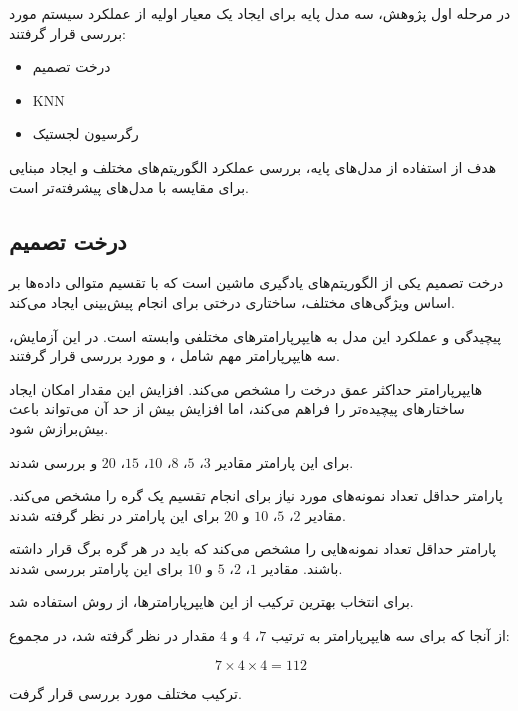 \documentclass[10pt,a4paper,twocolumn]{article}
\begin{document}
در مرحله اول پژوهش، سه مدل پایه برای ایجاد یک معیار اولیه
از عملکرد سیستم مورد بررسی قرار گرفتند:

\begin{itemize}
    \item درخت تصمیم
    \item KNN
    \item رگرسیون لجستیک
\end{itemize}

هدف از استفاده از مدل‌های پایه، بررسی عملکرد الگوریتم‌های
مختلف و ایجاد مبنایی برای مقایسه با مدل‌های پیشرفته‌تر است.


\subsection{درخت تصمیم}

درخت تصمیم یکی از الگوریتم‌های یادگیری ماشین است که با تقسیم
متوالی داده‌ها بر اساس ویژگی‌های مختلف، ساختاری درختی برای
انجام پیش‌بینی ایجاد می‌کند.

پیچیدگی و عملکرد این مدل به هایپرپارامترهای مختلفی وابسته است.
در این آزمایش، سه هایپرپارامتر مهم شامل
،
 و
 مورد بررسی قرار گرفتند.

هایپرپارامتر  حداکثر عمق درخت را مشخص می‌کند.
افزایش این مقدار امکان ایجاد ساختارهای پیچیده‌تر را فراهم
می‌کند، اما افزایش بیش از حد آن می‌تواند باعث بیش‌برازش شود.

برای این پارامتر مقادیر
$3$، $5$، $8$، $10$، $15$، $20$ و 
بررسی شدند.

پارامتر  حداقل تعداد نمونه‌های مورد
نیاز برای انجام تقسیم یک گره را مشخص می‌کند. مقادیر
$2$، $5$، $10$ و $20$ برای این پارامتر در نظر گرفته شدند.

پارامتر  حداقل تعداد نمونه‌هایی را
مشخص می‌کند که باید در هر گره برگ قرار داشته باشند. مقادیر
$1$، $2$، $5$ و $10$ برای این پارامتر بررسی شدند.

برای انتخاب بهترین ترکیب از این هایپرپارامترها، از روش
 استفاده شد.

از آنجا که برای سه هایپرپارامتر به ترتیب $7$، $4$ و $4$ مقدار
در نظر گرفته شد، در مجموع:

\[
7 \times 4 \times 4 = 112
\]

ترکیب مختلف مورد بررسی قرار گرفت.
\end{document}
